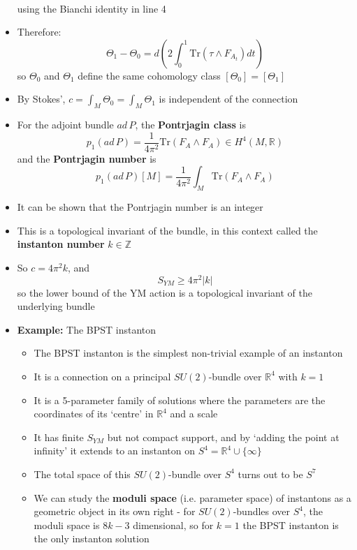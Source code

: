 \documentclass[12pt,a4paper]{article}
\numberwithin{equation}{section}
\begin{document}
\begin{itemize}
\begin{equation}
\begin{aligned}
			\end{aligned}
		\end{equation}
		using the Bianchi identity in line 4
		\item Therefore:
		\begin{equation}
			\Theta_{1}-\Theta_{0}=d\left(2\int_{0}^{1}\text{Tr}(\tau\wedge F_{A_{t}})dt\right)
		\end{equation}
		so $\Theta_{0}$ and $\Theta_{1}$ define the same cohomology class $[\Theta_{0}]=[\Theta_{1}]$
		\item By Stokes', $c=\int_{M}\Theta_{0}=\int_{M}\Theta_{1}$ is independent of the connection
		\item For the adjoint bundle $ad\,P$, the \textbf{Pontrjagin class} is 
		\begin{equation}
			p_{1}(ad\,P)=\frac{1}{4\pi^{2}}\text{Tr}(F_{A}\wedge F_{A})\in H^{4}(M,\mathbb{R})
		\end{equation}
		and the \textbf{Pontrjagin number} is
		\begin{equation}
			p_{1}(ad\,P)[M]=\frac{1}{4\pi^{2}}\int_{M}\text{Tr}(F_{A}\wedge F_{A})
		\end{equation}
		\item It can be shown that the Pontrjagin number is an integer
		\item This is a topological invariant of the bundle, in this context called the \textbf{instanton number} $k\in\mathbb{Z}$
		\item So $c=4\pi^{2}k$, and 
		\begin{equation}
			S_{YM}\geq 4\pi^{2}|k|
		\end{equation}
		so the lower bound of the YM action is a topological invariant of the underlying bundle
		\item \textbf{Example:} The BPST instanton
		\begin{itemize}
			\item The BPST instanton is the simplest non-trivial example of an instanton
			\item It is a connection on a principal $SU(2)$-bundle over $\mathbb{R}^{4}$ with $k=1$
			\item It is a 5-parameter family of solutions where the parameters are the coordinates of its `centre' in $\mathbb{R}^{4}$ and a scale
			\item It has finite $S_{YM}$ but not compact support, and by `adding the point at infinity' it extends to an instanton on $S^{4}=\mathbb{R}^{4}\cup\{\infty\}$
			\item The total space of this $SU(2)$-bundle over $S^{4}$ turns out to be $S^{7}$
			\item We can study the \textbf{moduli space} (i.e. parameter space) of instantons as a geometric object in its own right - for $SU(2)$-bundles over $S^{4}$, the moduli space is $8k-3$ dimensional, so for $k=1$ the BPST instanton is the only instanton solution
		\end{itemize}
	\end{itemize}
\end{document}
